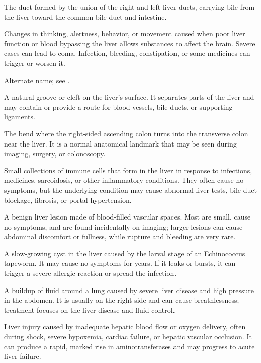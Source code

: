  The duct formed by the union of the right and left liver ducts, carrying bile from the liver toward the common bile duct and intestine.

 Changes in thinking, alertness, behavior, or movement caused when poor liver function or blood bypassing the liver allows substances to affect the brain. Severe cases can lead to coma. Infection, bleeding, constipation, or some medicines can trigger or worsen it.

 Alternate name; see .

 A natural groove or cleft on the liver's surface. It separates parts of the liver and may contain or provide a route for blood vessels, bile ducts, or supporting ligaments.

 The bend where the right-sided ascending colon turns into the transverse colon near the liver. It is a normal anatomical landmark that may be seen during imaging, surgery, or colonoscopy.

 Small collections of immune cells that form in the liver in response to infections, medicines, sarcoidosis, or other inflammatory conditions. They often cause no symptoms, but the underlying condition may cause abnormal liver tests, bile-duct blockage, fibrosis, or portal hypertension.

 A benign liver lesion made of blood-filled vascular spaces. Most are small, cause no symptoms, and are found incidentally on imaging; larger lesions can cause abdominal discomfort or fullness, while rupture and bleeding are very rare.

 A slow-growing cyst in the liver caused by the larval
stage of an Echinococcus tapeworm. It may cause no symptoms for years. If it leaks or
bursts, it can trigger a severe allergic reaction or spread the infection.

 A buildup of fluid around a lung caused by severe liver disease and high pressure in the abdomen. It is usually on the right side and can cause breathlessness; treatment focuses on the liver disease and fluid control.

 Liver injury caused by inadequate hepatic blood flow or oxygen delivery, often during
shock, severe hypoxemia, cardiac failure, or hepatic vascular occlusion. It can produce
a rapid, marked rise in aminotransferases and may progress to acute liver failure.

